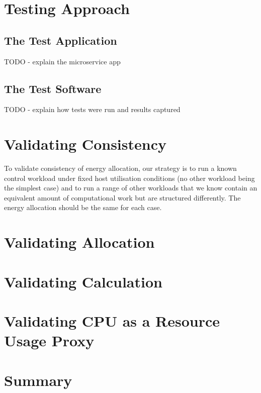 \section{Testing Approach}

\subsection{The Test Application}
TODO - explain the microservice app

\subsection{The Test Software}
TODO - explain how tests were run and results captured

\section{Validating Consistency}

To validate consistency of energy allocation, our strategy is to run a known control workload under fixed host utilisation conditions (no other workload being the simplest case) and to run a range of other workloads that we know contain an equivalent amount of computational work but are structured differently.  The energy allocation should be the same for each case.


\section{Validating Allocation}

\section{Validating Calculation}

\section{Validating CPU as a Resource Usage Proxy}

\section{Summary}

